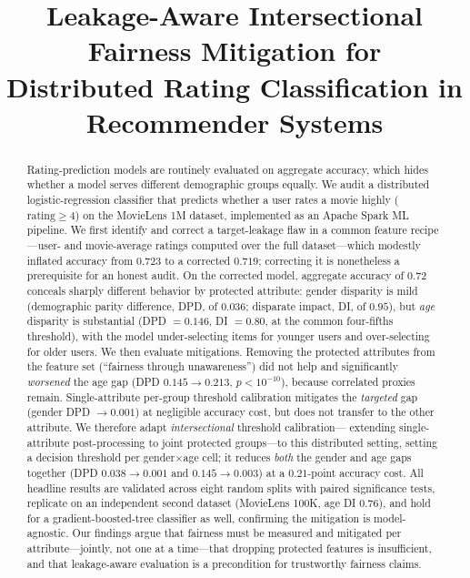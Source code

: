 \documentclass[conference]{IEEEtran}
\begin{document}
\title{Leakage-Aware Intersectional Fairness Mitigation for\\
Distributed Rating Classification in Recommender Systems}

\author{
}

\maketitle

\begin{abstract}
Rating-prediction models are routinely evaluated on aggregate accuracy, which
hides whether a model serves different demographic groups equally. We audit a
distributed logistic-regression classifier that predicts whether a user rates a
movie highly ($\text{rating}\geq 4$) on the MovieLens 1M dataset, implemented as an
Apache Spark ML pipeline. We first identify and correct a target-leakage flaw in a
common feature recipe---user- and movie-average ratings computed over the full
dataset---which modestly inflated accuracy from $0.723$ to a corrected $0.719$;
correcting it is nonetheless a prerequisite for an honest audit. On the corrected
model, aggregate accuracy of $0.72$ conceals sharply different behavior by protected
attribute: gender disparity is mild (demographic parity difference, DPD, of $0.036$;
disparate impact, DI, of $0.95$), but \emph{age} disparity is substantial
(DPD $=0.146$, DI $=0.80$, at the common four-fifths threshold), with the model
under-selecting items for younger users and over-selecting for older users. We then
evaluate mitigations. Removing the protected attributes from the feature set
(``fairness through unawareness'') did not help and significantly \emph{worsened} the
age gap (DPD $0.145\rightarrow0.213$, $p<10^{-10}$), because correlated proxies remain.
Single-attribute per-group threshold calibration mitigates the \emph{targeted} gap
(gender DPD $\rightarrow 0.001$) at negligible accuracy cost, but does not transfer to
the other attribute. We therefore adapt \emph{intersectional} threshold calibration---
extending single-attribute post-processing to joint protected groups---to this distributed
setting, setting a decision threshold per gender$\times$age cell; it reduces \emph{both} the
gender and age gaps together (DPD $0.038\rightarrow0.001$ and $0.145\rightarrow0.003$) at
a $0.21$-point accuracy cost. All headline results are validated across eight random
splits with paired significance tests, replicate on an independent second dataset
(MovieLens 100K, age DI $0.76$), and hold for a gradient-boosted-tree classifier as well,
confirming the mitigation is model-agnostic. Our findings argue that fairness must be
measured and mitigated per attribute---jointly, not one at a time---that dropping protected
features is insufficient, and that leakage-aware evaluation is a precondition for
trustworthy fairness claims.
\end{abstract}
\end{document}
